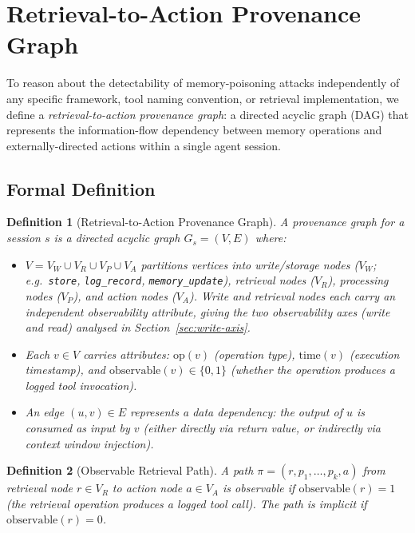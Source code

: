 \documentclass{article}
\newtheorem{definition}{Definition}
\begin{document}
\section{Retrieval-to-Action Provenance Graph}
\label{sec:event-graph}

To reason about the detectability of memory-poisoning attacks independently of any specific framework, tool naming convention, or retrieval implementation, we define a \emph{retrieval-to-action provenance graph}: a directed acyclic graph (DAG) that represents the information-flow dependency between memory operations and externally-directed actions within a single agent session.

\subsection{Formal Definition}
\label{sec:graph-formal}

\begin{definition}[Retrieval-to-Action Provenance Graph]\label{def:graph}
A provenance graph for a session $s$ is a directed acyclic graph $G_s = (V, E)$ where:
\begin{itemize}
    \item $V = V_W \cup V_R \cup V_P \cup V_A$ partitions vertices into \emph{write/storage nodes} ($V_W$; e.g.\ \texttt{store}, \texttt{log\_record}, \texttt{memory\_update}), \emph{retrieval nodes} ($V_R$), \emph{processing nodes} ($V_P$), and \emph{action nodes} ($V_A$). Write and retrieval nodes each carry an independent observability attribute, giving the two observability axes (write and read) analysed in Section~\ref{sec:write-axis}.
    \item Each $v \in V$ carries attributes: $\text{op}(v)$ (operation type), $\text{time}(v)$ (execution timestamp), and $\text{observable}(v) \in \{0, 1\}$ (whether the operation produces a logged tool invocation).
    \item An edge $(u, v) \in E$ represents a \emph{data dependency}: the output of $u$ is consumed as input by $v$ (either directly via return value, or indirectly via context window injection).
\end{itemize}
\end{definition}

\begin{definition}[Observable Retrieval Path]\label{def:obs-path}
A path $\pi = (r, p_1, \ldots, p_k, a)$ from retrieval node $r \in V_R$ to action node $a \in V_A$ is \emph{observable} if $\text{observable}(r) = 1$ (the retrieval operation produces a logged tool call). The path is \emph{implicit} if $\text{observable}(r) = 0$.
\end{definition}
\end{document}

